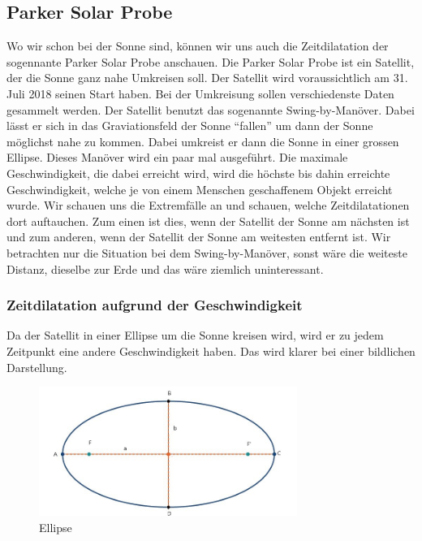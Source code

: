 \begin{refsection}
\subsection{Parker Solar Probe}
Wo wir schon bei der Sonne sind, können wir uns auch die Zeitdilatation der sogennante Parker Solar Probe anschauen. Die Parker Solar Probe ist ein Satellit, der die Sonne ganz nahe Umkreisen soll. Der Satellit wird voraussichtlich am 31. Juli 2018 seinen Start haben. Bei der Umkreisung sollen verschiedenste Daten gesammelt werden. Der Satellit benutzt das sogenannte Swing-by-Manöver. Dabei lässt er sich in das Graviationsfeld der Sonne ``fallen'' um dann der Sonne möglichst nahe zu kommen. Dabei umkreist er dann die Sonne in einer grossen Ellipse. Dieses Manöver wird ein paar mal  ausgeführt. Die maximale Geschwindigkeit, die dabei erreicht wird, wird die höchste bis dahin erreichte Geschwindigkeit, welche je von einem Menschen geschaffenem Objekt erreicht wurde. Wir schauen uns die Extremfälle an und schauen, welche Zeitdilatationen dort auftauchen. Zum einen ist dies, wenn der Satellit der Sonne am nächsten ist und zum anderen, wenn der Satellit der Sonne am weitesten entfernt ist. Wir betrachten nur die Situation bei dem Swing-by-Manöver, sonst wäre die weiteste Distanz, dieselbe zur Erde und das wäre ziemlich uninteressant. 

\subsubsection{Zeitdilatation aufgrund der Geschwindigkeit}
Da der Satellit in einer Ellipse um die Sonne kreisen wird, wird er zu jedem Zeitpunkt eine andere Geschwindigkeit haben. Das wird klarer bei einer bildlichen Darstellung.
\begin{figure}[h]
    \centering
    \includegraphics[width=0.75\textwidth]{gps/pictures/Ellipse.jpg}
    \caption{Ellipse}
    \label{pic:ellipse}
\end{figure}


\end{refsection}
